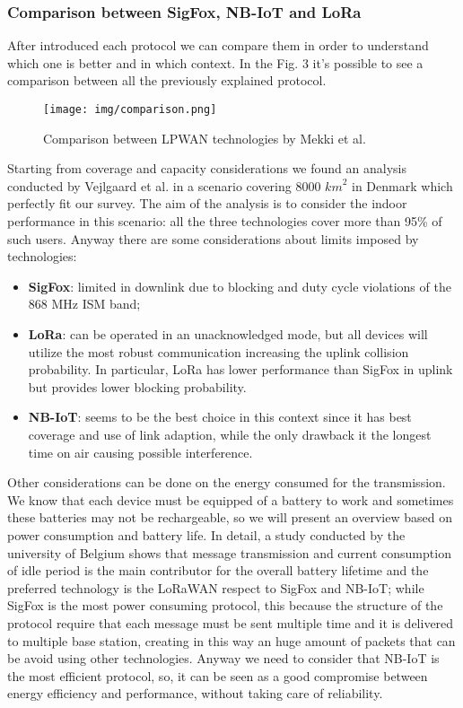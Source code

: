 \documentclass[sigconf]{acmart}
\begin{document}
      \subsubsection{Comparison between SigFox, NB-IoT and LoRa\textup{\textregistered}}
      After introduced each protocol we can compare them in order to understand which one is better and in which context. In the Fig. 3 it's possible to see a comparison between all the previously explained protocol.
      \begin{figure}[h!]
        \texttt{[image: img/comparison.png]}
        \caption{Comparison between LPWAN technologies by Mekki et al. \cite{mekki}}
        \label{fig:comparison}
    \end{figure}
      
      Starting from coverage and capacity considerations we found an analysis conducted by Vejlgaard et al. \cite{vejlgaard} in a scenario covering 8000 \({km}^2\) in Denmark which perfectly fit our survey. The aim of the analysis is to consider the indoor performance in this scenario: all the three technologies cover more than 95\% of such users. Anyway there are some considerations about limits imposed by technologies:
      \begin{itemize}
      \item \textbf{SigFox}: limited in downlink due to blocking and duty cycle violations of the 868 MHz ISM band;
      \item \textbf{LoRa\textup{\textregistered}}: can be operated in an unacknowledged mode, but all devices will utilize the most robust communication increasing the uplink collision probability. In particular, LoRa has lower performance than SigFox in uplink but provides lower blocking probability.
      \item \textbf{NB-IoT}: seems to be the best choice in this context since it has best coverage and use of link adaption, while the only drawback it the longest time on air causing possible interference.
      \end{itemize}
      
      Other considerations can be done on the energy consumed for the transmission. We know that each device must be equipped of a battery to work and sometimes these batteries may not be rechargeable, so we will present an overview based on power consumption and battery life. In detail, a study conducted by the university of Belgium \cite{belgium} shows that message transmission and current consumption of idle period is the main contributor for the overall battery lifetime and the preferred technology is the LoRaWAN respect to SigFox and NB-IoT; while SigFox is the most power consuming protocol, this because the structure of the protocol require that each message must be sent multiple time and it is delivered to multiple base station, creating in this way an huge amount of packets that can be avoid using other technologies. Anyway we need to consider that NB-IoT is the most efficient protocol, so, it can be seen as a good compromise between energy efficiency and performance, without taking care of reliability.
      
\end{document}
